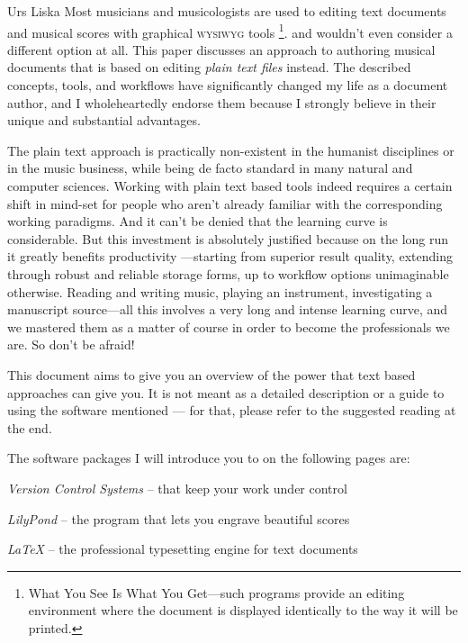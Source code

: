 \documentclass[../../LilyPond-Tutorials]{subfiles}
\begin{document}
\begin{authorAbstract}{Urs Liska}
Most musicians and musicologists are used to editing text documents and musical scores with graphical \textsc{wysiwyg} tools%
\footnote{What You See Is What You Get---such programs provide an editing environment where the document is displayed identically to the way it will be printed.}.
and wouldn't even consider a different option at all.
This paper discusses an approach to authoring musical documents that is based on editing \emph{plain text files} instead.
The described concepts, tools, and workflows have significantly changed my life as a document author, and I  wholeheartedly endorse them because I strongly believe in their unique and substantial advantages.

The plain text approach is practically non-existent in the humanist disciplines or in the music business, while being de facto standard in many natural and computer sciences.
Working with plain text based tools indeed requires a certain shift in mind-set for people who aren't already familiar with the corresponding working paradigms.
And it can't be denied that the learning curve is considerable.
But this investment is absolutely justified because on the long run it greatly benefits productivity ---starting from superior result quality, extending through robust and reliable storage forms, up to workflow options unimaginable otherwise.
Reading and writing music, playing an instrument, investigating a manuscript source---all this involves a very long and intense learning curve, and we mastered them as a matter of course in order to become the professionals we are.
So don't be afraid!

This document aims to give you an overview of the
power that text based approaches can give you.
It is not meant as a detailed description or a guide
to using the software mentioned --- for that, please refer
to the suggested reading at the end.

The software packages I will introduce you to on the following pages are:
\begin{itemize*}
\item \emph{Version Control Systems} -- that keep your work under control
\item \emph{LilyPond} -- the program that lets you engrave beautiful scores
\item \emph{\LaTeX} -- the professional typesetting engine for text documents
\end{itemize*}

\end{authorAbstract}
\end{document}
